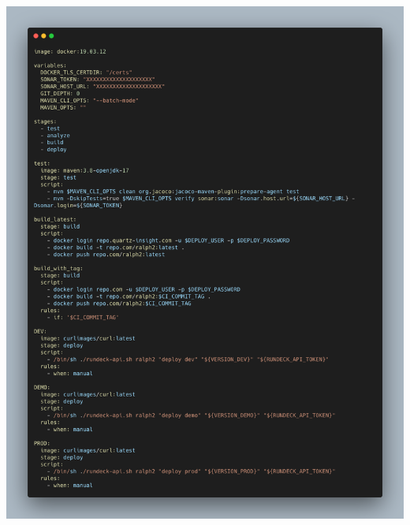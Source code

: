\documentclass[aspectratio=169]{beamer}
\begin{document}
\begin{frame}
\begin{columns}
\begin{column}{0.5\textwidth}
      \includegraphics[height=0.75\textheight, center]{Imgs/CICD-ralph.png}
    \end{column}
  \end{columns}
\end{frame}
\end{document}
